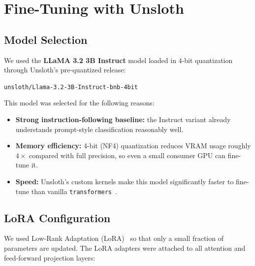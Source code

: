 \documentclass[12pt,a4paper]{article}
\begin{document}
\section{Fine-Tuning with Unsloth}
\label{sec:finetuning}

\subsection{Model Selection}

We used the \textbf{LLaMA 3.2 3B Instruct} model loaded in 4-bit quantization
through Unsloth's pre-quantized release:
\begin{center}
    \texttt{unsloth/Llama-3.2-3B-Instruct-bnb-4bit}
\end{center}

This model was selected for the following reasons:
\begin{itemize}[noitemsep]
    \item \textbf{Strong instruction-following baseline:} the Instruct variant
          already understands prompt-style classification reasonably well.
    \item \textbf{Memory efficiency:} 4-bit (NF4) quantization reduces VRAM
          usage roughly $4\times$ compared with full precision, so even a
          small consumer GPU can fine-tune it.
    \item \textbf{Speed:} Unsloth's custom kernels make this model
          significantly faster to fine-tune than vanilla
          \texttt{transformers}~\cite{unsloth}.
\end{itemize}

\subsection{LoRA Configuration}

We used Low-Rank Adaptation (LoRA)~\cite{hu2021lora} so that only a small
fraction of parameters are updated. The LoRA adapters were attached to all
attention and feed-forward projection layers:
\end{document}
